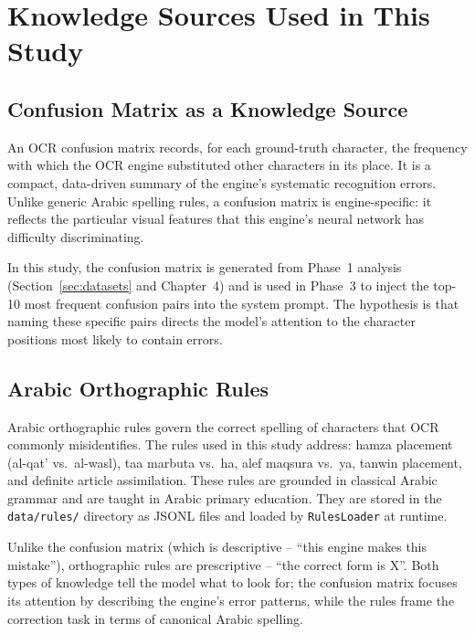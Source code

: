 \section{Knowledge Sources Used in This Study}
\label{sec:knowledge_sources}

\subsection{Confusion Matrix as a Knowledge Source}
\label{subsec:ks_confusion}

An OCR confusion matrix records, for each ground-truth character, the frequency
with which the OCR engine substituted other characters in its place.
It is a compact, data-driven summary of the engine's systematic recognition
errors.
Unlike generic Arabic spelling rules, a confusion matrix is engine-specific:
it reflects the particular visual features that this engine's neural network has
difficulty discriminating.

In this study, the confusion matrix is generated from Phase~1 analysis
(Section~\ref{sec:datasets} and Chapter~4) and is used in Phase~3 to inject
the top-10 most frequent confusion pairs into the system prompt.
The hypothesis is that naming these specific pairs directs the model's attention
to the character positions most likely to contain errors.

\subsection{Arabic Orthographic Rules}
\label{subsec:ks_rules}

Arabic orthographic rules govern the correct spelling of characters that OCR
commonly misidentifies.
The rules used in this study address: hamza placement (al-qat' vs.\ al-wasl),
taa marbuta vs.\ ha, alef maqsura vs.\ ya, tanwin placement, and definite
article assimilation.
These rules are grounded in classical Arabic grammar and are taught in Arabic
primary education.
They are stored in the \texttt{data/rules/} directory as JSONL files and loaded
by \texttt{RulesLoader} at runtime.

Unlike the confusion matrix (which is descriptive -- ``this engine makes this
mistake''), orthographic rules are prescriptive -- ``the correct form is X''.
Both types of knowledge tell the model what to look for; the confusion matrix
focuses its attention by describing the engine's error patterns, while the
rules frame the correction task in terms of canonical Arabic spelling.

